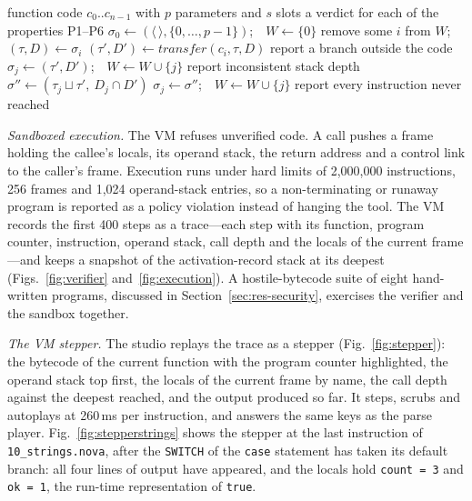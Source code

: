 \documentclass[conference]{IEEEtran}
\newcommand{\code}[1]{\texttt{#1}}
\begin{document}
\begin{algorithm}[!t]
\caption{Bytecode verification by abstract interpretation}
\label{alg:verify}
\begin{algorithmic}[1]
\REQUIRE function code $c_0..c_{n-1}$ with $p$ parameters and $s$ slots
\ENSURE a verdict for each of the properties P1--P6
\STATE $\sigma_0 \gets (\langle\,\rangle, \{0,\dots,p-1\})$;\ \ $W \gets \{0\}$
  \STATE remove some $i$ from $W$;\ \ $(\tau, D) \gets \sigma_i$
  \STATE $(\tau', D') \gets \mathit{transfer}(c_i, \tau, D)$ 
    \IF{$j \notin [0, n)$}
      \STATE report a branch outside the code 
      \STATE $\sigma_j \gets (\tau', D')$;\ \ $W \gets W \cup \{j\}$
      \STATE report inconsistent stack depth 
    \ELSE
      \STATE $\sigma'' \gets (\tau_j \sqcup \tau',\ D_j \cap D')$
        \STATE $\sigma_j \gets \sigma''$;\ \ $W \gets W \cup \{j\}$
      \ENDIF
    \ENDIF
  \ENDFOR
\ENDWHILE
\STATE report every instruction never reached 
\end{algorithmic}
\end{algorithm}

\emph{Sandboxed execution.} The VM refuses unverified code. A call pushes a frame holding the callee's locals, its operand stack, the return address and a control link to the caller's frame. Execution runs under hard limits of 2,000,000 instructions, 256 frames and 1,024 operand-stack entries, so a non-terminating or runaway program is reported as a policy violation instead of hanging the tool. The VM records the first 400 steps as a trace---each step with its function, program counter, instruction, operand stack, call depth and the locals of the current frame---and keeps a snapshot of the activation-record stack at its deepest (Figs.~\ref{fig:verifier} and~\ref{fig:execution}). A hostile-bytecode suite of eight hand-written programs, discussed in Section~\ref{sec:res-security}, exercises the verifier and the sandbox together.

\emph{The VM stepper.} The studio replays the trace as a stepper (Fig.~\ref{fig:stepper}): the bytecode of the current function with the program counter highlighted, the operand stack top first, the locals of the current frame by name, the call depth against the deepest reached, and the output produced so far. It steps, scrubs and autoplays at 260\,ms per instruction, and answers the same keys as the parse player. Fig.~\ref{fig:stepperstrings} shows the stepper at the last instruction of \code{10\_strings.nova}, after the \code{SWITCH} of the \code{case} statement has taken its default branch: all four lines of output have appeared, and the locals hold \code{count = 3} and \code{ok = 1}, the run-time representation of \code{true}.
\end{document}
